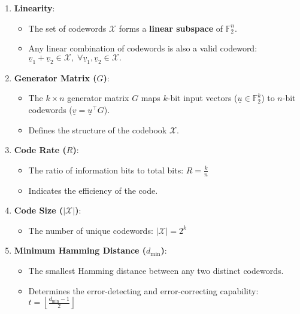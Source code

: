 \documentclass[11pt]{article}
\providecommand{\tightlist}{%
      \setlength{\itemsep}{0pt}\setlength{\parskip}{0pt}}
\begin{document}
\begin{enumerate}
\def\labelenumi{\arabic{enumi}.}
\tightlist
\item
  \textbf{Linearity}:

  \begin{itemize}
  \tightlist
  \item
    The set of codewords \(\mathcal{X}\) forms a \textbf{linear
    subspace} of \(\mathbb{F}_2^n\).
  \item
    Any linear combination of codewords is also a valid codeword:
    \(\underline{v}_1 + \underline{v}_2 \in \mathcal{X}, \; \forall \underline{v}_1, \underline{v}_2 \in \mathcal{X}.\)
  \end{itemize}
\item
  \textbf{Generator Matrix (\(G\))}:

  \begin{itemize}
  \tightlist
  \item
    The \(k \times n\) generator matrix \(G\) maps \(k\)-bit input
    vectors (\(\underline{u} \in \mathbb{F}_2^k\)) to \(n\)-bit
    codewords (\(\underline{v} = \underline{u}^\top G\)).
  \item
    Defines the structure of the codebook \(\mathcal{X}\).
  \end{itemize}
\item
  \textbf{Code Rate (\(R\))}:

  \begin{itemize}
  \tightlist
  \item
    The ratio of information bits to total bits: \(R = \frac{k}{n}\)
  \item
    Indicates the efficiency of the code.
  \end{itemize}
\item
  \textbf{Code Size (\(|\mathcal{X}|\))}:

  \begin{itemize}
  \tightlist
  \item
    The number of unique codewords: \(|\mathcal{X}| = 2^k\)
  \end{itemize}
\item
  \textbf{Minimum Hamming Distance (\(d_\text{min}\))}:

  \begin{itemize}
  \tightlist
  \item
    The smallest Hamming distance between any two distinct codewords.
  \item
    Determines the error-detecting and error-correcting capability:
    \(t = \left\lfloor \frac{d_\text{min} - 1}{2} \right\rfloor\)


\end{itemize}
\end{enumerate}
\end{document}
